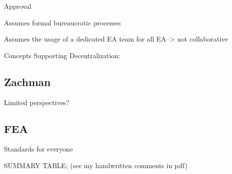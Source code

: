 Approval

Assumes formal bureaucratic processes

Assumes the usage of a dedicated EA team for all EA--> not collaborative


Concepts Supporting Decentralization:

\subsection{Zachman}
Limited perspectives?

\subsection{FEA}
Standards for everyone

SUMMARY TABLE;
(see my handwritten comments in pdf)
